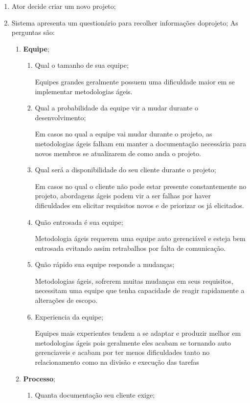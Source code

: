 	\begin{enumerate}
		\item Ator decide criar um novo projeto;
		\item Sistema apresenta um questionário para recolher informações doprojeto;
			As perguntas são:
			\begin{enumerate}
				\item \textbf{Equipe};
					\begin{enumerate}
						\item Qual o tamanho de sua equipe;

							Equipes grandes geralmente possuem uma dificuldade maior em se implementar metodologias ágeis.

						\item Qual a probabilidade da equipe vir a mudar durante o desenvolvimento;

							Em casos no qual a equipe vai mudar durante o projeto, as metodologias ágeis falham em manter a documentação necessária para novos membros se atualizarem de como anda o projeto.

						\item Qual será a disponibilidade do seu cliente durante o projeto;

							Em casos no qual o cliente não pode estar presente constantemente no projeto, abordagens ágeis podem vir a ser falhas por haver dificuldades em elicitar requisitos novos e de priorizar os já elicitados.

						\item Quão entrosada é sua equipe;

							Metodologia ágeis requerem uma equipe auto gerenciável e esteja bem entrosada evitando assim retrabalhos por falta de comunicação.

						\item Quão rápido sua equipe responde a mudanças;

							Metodologias ágeis, sofrerem muitas mudanças em seus requisitos, necessitam uma equipe que tenha capacidade de reagir rapidamente a alterações de escopo.

						\item Experiencia da equipe;

							Equipes mais experientes tendem a se adaptar e produzir melhor em metodologias ágeis pois geralmente eles acabam se tornando auto gerenciaveis e acabam por ter menos dificuldades tanto no relacionamento como na divisão e execução das tarefas

					\end{enumerate}
				\item \textbf{Processo};
					\begin{enumerate}
						\item Quanta documentação seu cliente exige;


\end{enumerate}
\end{enumerate}
\end{enumerate}
